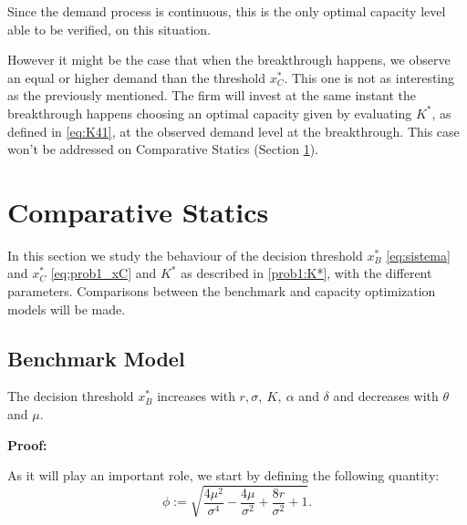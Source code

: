 Since the demand process is continuous, this is the only optimal capacity level able to be verified, on this situation.

However it might be the case that when the breakthrough happens, we observe an equal or higher demand than the threshold $x^*_C$. This one is not as interesting as the previously mentioned. The firm will invest at the same instant the breakthrough happens choosing an optimal capacity given by evaluating $K^*$, as defined in \eqref{eq:K41}, at the observed demand level at the breakthrough. This case won't be addressed on Comparative Statics (Section \ref{prob1:cs}).





\section{Comparative Statics}
\label{prob1:cs}

In this section we study the behaviour of the decision threshold $x^*_B$ \eqref{eq:sistema} and $x^*_{C}$ \eqref{eq:prob1_xC} and $K^*$ as described in \eqref{prob1:K*}, with
the different parameters. Comparisons between the benchmark and capacity optimization models will be made.


\subsection{Benchmark Model}

\begin{prop}
	\label{1_prop1}
The decision threshold $x^*_B$ increases with $r, \sigma, \ K, \ \alpha$ and  $\delta$ and decreases with $\theta$ and $\mu$.
\end{prop}

\textbf{Proof:}

As it will play an important role, we start by defining the following quantity:
\begin{equation}
\phi:=\sqrt{\frac{4 \mu ^2}{\sigma ^4}-\frac{4 \mu }{\sigma ^2}+\frac{8 r}{\sigma ^2}+1}.
\label{phi}
\end{equation}

